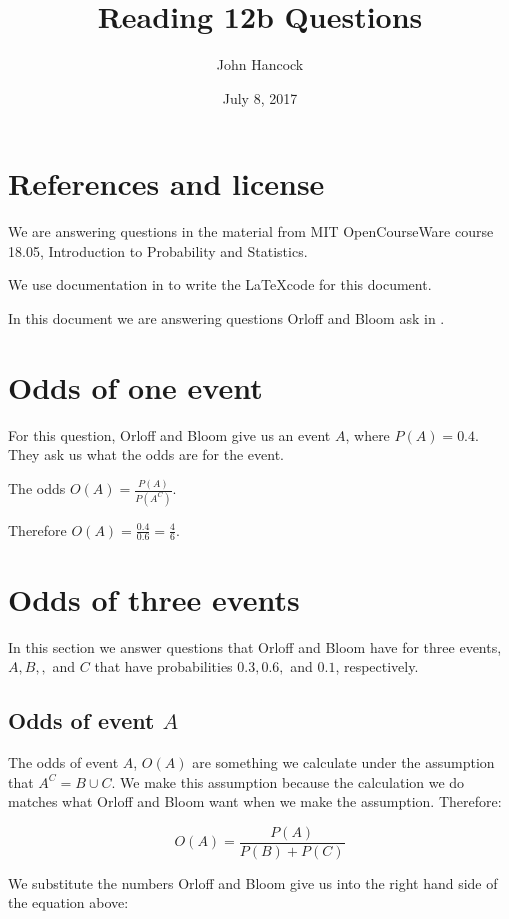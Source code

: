 \documentclass{article}
\title{Reading 12b Questions}
\author{John Hancock}
\date{July 8, 2017}
\begin{document}
\maketitle 
\tableofcontents
\section{References and license}
We are answering questions in the material from MIT OpenCourseWare
course 18.05, Introduction to Probability and Statistics.

We use documentation in to write the \LaTeX code for
this document.

In this document we are answering questions Orloff and Bloom ask in
\cite{reading12bqu}.

\section{Odds of one event}
For this question, Orloff and Bloom give us an event $A$, where 
$P\left(A \right) = 0.4$.  They ask us what the odds are for the event.

The odds $O\left(A\right) = \frac{P\left(A\right)}{P\left(A^{C}\right)}$.

Therefore $O\left(A \right) = \frac{0.4}{0.6} = \frac{4}{6}$.

\section{Odds of three events}
In this section we answer questions that Orloff and Bloom have for three
events, $A, B, ,$ and $C$ that have probabilities $0.3, 0.6,$ and $0.1$,
respectively.

\subsection{Odds of event $A$}

The odds of event $A$, $O\left(A\right)$ are something we calculate under
the assumption that $A^{C} = B \cup C$.  We make this assumption because
the calculation we do matches what Orloff and Bloom want when we make the
assumption. Therefore:

\begin{equation}
O\left(A\right) = \frac{P\left(A\right)}{P\left(B\right) + P \left(C\right)}
\end{equation}

We substitute the numbers Orloff and Bloom give us into the right hand side
of the equation above:
\end{document}
